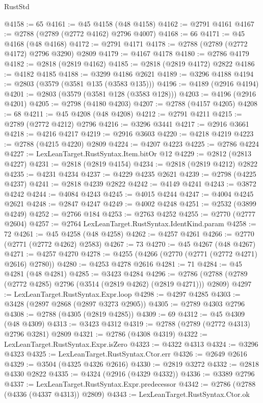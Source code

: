 \begin{lexlean}{RustStd}
\begin{coremodule}
@4158 := 65
@4161 := @45 @4158 (@48 @4158)
@4162 := @2791 @4161
@4167 := @2788 (@2789 (@2772 @4162) @2796 @4007)
@4168 := 66
@4171 := @45 @4168 (@48 @4168)
@4172 := @2791 @4171
@4178 := @2788 (@2789 (@2772 @4172) @2796 @3290) @2809
@4179 := @4167 @4178
@4180 := @2786 @4179
@4182 := @2818 (@2819 @4162)
@4185 := @2818 (@2819 @4172) @2822
@4186 := @4182 @4185
@4188 := @3299 @4186 @2621
@4189 := @3296 @4188
@4194 := @2803 (@3579 (@3581 @135 (@3583 @135)))
@4196 := @4189 (@2916 @4194)
@4201 := @2803 (@3579 (@3581 @128 (@3583 @128)))
@4203 := @4196 (@2916 @4201)
@4205 := @2798 (@4180 @4203)
@4207 := @2788 (@4157 @4205)
@4208 := 68
@4211 := @45 @4208 (@48 @4208)
@4212 := @2791 @4211
@4215 := @2789 (@2772 @4212) @2796
@4216 := @3296 @3441
@4217 := @2916 @3661
@4218 := @4216 @4217
@4219 := @2916 @3603
@4220 := @4218 @4219
@4223 := @2788 (@4215 @4220) @2809
@4224 := @4207 @4223
@4225 := @2786 @4224
@4227 := LexLeanTarget.RustSyntax.Item.bitOr @12
@4229 := @2812 (@2813 @4227)
@4231 := @2818 (@2819 @4154)
@4234 := @2818 (@2819 @4212) @2822
@4235 := @4231 @4234
@4237 := @4229 @4235 @2621
@4239 := @2798 (@4225 @4237)
@4241 := @2818 @4239 @2822
@4242 := @4149 @4241
@4243 := @3872 @4242
@4244 := @4084 @4243
@4245 := @4015 @4244
@4247 := @4004 @4245 @2621
@4248 := @2847 @4247
@4249 := @4002 @4248
@4251 := @2532 (@3899 @4249)
@4252 := @2766 @184
@4253 := @2763 @4252
@4255 := @2770 (@2777 @2604)
@4257 := @2764 LexLeanTarget.RustSyntax.IdentKind.param
@4258 := 72
@4261 := @45 @4258 (@48 @4258)
@4262 := @4257 @4261
@4266 := @2770 (@2771 (@2772 @4262) @2583)
@4267 := 73
@4270 := @45 @4267 (@48 @4267)
@4271 := @4257 @4270
@4278 := @4255 (@4266 (@2770 (@2771 (@2772 @4271) @2616) @2780))
@4280 := @4253 @4278 @2616
@4281 := 71
@4284 := @45 @4281 (@48 @4281)
@4285 := @3423 @4284
@4296 := @2786 (@2788 (@2789 (@2772 @4285) @2796 (@3514 (@2819 @4262) (@2819 @4271))) @2809)
@4297 := LexLeanTarget.RustSyntax.Expr.loop
@4298 := @4297 @4285
@4303 := @3428 (@2897 @2868 (@2897 @3273 @2905))
@4305 := @2789 @4303 @2796
@4308 := @2788 (@4305 (@2819 @4285))
@4309 := 69
@4312 := @45 @4309 (@48 @4309)
@4313 := @3423 @4312
@4319 := @2788 (@2789 (@2772 @4313) @2796 @3281) @2809
@4321 := @2786 (@4308 @4319)
@4322 := LexLeanTarget.RustSyntax.Expr.isZero
@4323 := @4322 @4313
@4324 := @3296 @4323
@4325 := LexLeanTarget.RustSyntax.Ctor.err
@4326 := @2649 @2616
@4329 := @3504 (@4325 @4326 @2616)
@4330 := @2819 @3272
@4332 := @2818 @4330 @2822
@4335 := @4324 (@2916 (@4329 @4332))
@4336 := @3389 @2796
@4337 := LexLeanTarget.RustSyntax.Expr.predecessor
@4342 := @2786 (@2788 (@4336 (@4337 @4313)) @2809)
@4343 := LexLeanTarget.RustSyntax.Ctor.ok

\end{coremodule}
\end{lexlean}
